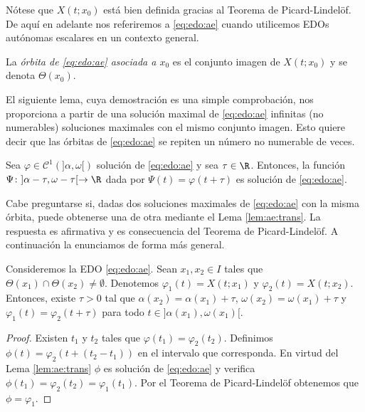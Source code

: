 \documentclass{article}
\begin{document}
Nótese que $X(t; x_0)$ está bien definida gracias al Teorema de Picard-Lindelöf. De aquí en adelante
nos referiremos a \eqref{eq:edo:ae} cuando utilicemos EDOs autónomas escalares en un contexto
general.

\begin{definition}
  La \emph{órbita de \eqref{eq:edo:ae} asociada a $x_0$} es el conjunto imagen de $X(t; x_0)$ y se
  denota $\Theta(x_0)$.
\end{definition}

El siguiente lema, cuya demostración es una simple comprobación, nos proporciona a partir de una
solución maximal de \eqref{eq:edo:ae} infinitas (no numerables) soluciones maximales con el mismo
conjunto imagen. Esto quiere decir que las órbitas de \eqref{eq:edo:ae} se repiten un número no
numerable de veces.

\begin{lemma} \label{lem:ae:trans} Sea $\varphi \in \mathcal{C}^1(]\alpha, \omega[)$ solución de
  \eqref{eq:edo:ae} y sea $\tau \in \R$. Entonces, la función
  $\Psi \colon ]\alpha-\tau, \omega-\tau[ \to \R$ dada por $\Psi(t) = \varphi(t+\tau)$ es solución
  de \eqref{eq:edo:ae}.
\end{lemma}

Cabe preguntarse si, dadas dos soluciones maximales de \eqref{eq:edo:ae} con la misma órbita, puede
obtenerse una de otra mediante el Lema \ref{lem:ae:trans}. La respuesta es afirmativa y es
consecuencia del Teorema de Picard-Lindelöf. A continuación la enunciamos de forma más general.

\begin{lemma} \label{lem:ae:trans:2} Consideremos la EDO \eqref{eq:edo:ae}. Sean $x_1, x_2 \in I$
  tales que $\Theta(x_1) \cap \Theta(x_2) \ne \emptyset$. Denotemos $\varphi_1(t) = X(t;x_1)$ y
  $\varphi_2(t) = X(t;x_2)$. Entonces, existe $\tau > 0$ tal que $\alpha(x_2) = \alpha(x_1)+\tau$,
  $\omega(x_2) = \omega(x_1)+\tau$ y $\varphi_1(t) = \varphi_2(t+\tau)$ para todo
  $t \in ]\alpha(x_1), \omega(x_1)[$.
\end{lemma}
\begin{proof}
  Existen $t_1$ y $t_2$ tales que $\varphi(t_1) = \varphi_2(t_2)$. Definimos
  $\phi(t) = \varphi_2(t + (t_2 - t_1))$ en el intervalo que corresponda. En virtud del Lema
  \ref{lem:ae:trans} $\phi$ es solución de \eqref{eq:edo:ae} y verifica
  $\phi(t_1) = \varphi_2(t_2) = \varphi_1(t_1)$. Por el Teorema de Picard-Lindelöf obtenemos que
  $\phi = \varphi_1$.
\end{proof}
\end{document}
